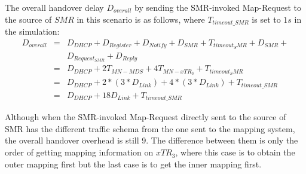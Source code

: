 The overall handover delay $D_{overall}$ by sending the SMR-invoked Map-Request to the source of $SMR$ in this scenario is as follows, where $T_{timeout\_SMR}$ is set to $1 s$ in the simulation:
\begin{eqnarray}
D_{overall} &=& D_{DHCP} + D_{Register} + D_{Notify} + D_{SMR} + T_{timeout_SMR} + D_{SMR} +  \nonumber \\
& & D_{Request_{SMR}} + D_{Reply} \nonumber \\
&=& D_{DHCP} + 2T_{MN-MDS} + 4T_{MN-xTR_3} + T_{timeout_SMR}\nonumber \\
&=& D_{DHCP} + 2* (3*D_{Link}) + 4*(3*D_{Link}) + T_{timeout\_SMR} \nonumber \\
&=& D_{DHCP} + 18D_{Link} + T_{timeout\_SMR} 
\end{eqnarray}

Although when the SMR-invoked Map-Request directly sent to the source of SMR has the different traffic schema from the one sent to the mapping system, the overall handover overhead is still 9. The difference between them is only the order of getting mapping information on $xTR_3$, where this case is to obtain the outer mapping first but the last case is to get the inner mapping first.

